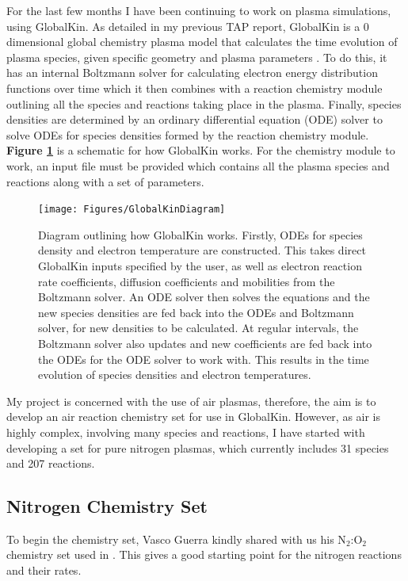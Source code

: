 \documentclass[11pt, oneside]{article}   	%
\begin{document}
For the last few months I have been continuing to work on plasma simulations, using GlobalKin.
As detailed in my previous TAP report, GlobalKin is a 0 dimensional global chemistry plasma model that calculates the time evolution of plasma species, given specific geometry and plasma parameters \cite{Stafford2004O2}.
To do this, it has an internal Boltzmann solver for calculating electron energy distribution functions over time which it then combines with a reaction chemistry module outlining all the species and reactions taking place in the plasma.
Finally, species densities are determined by an ordinary differential equation (ODE) solver to solve ODEs for species densities formed by the reaction chemistry module.
\textbf{Figure \ref{fig:GlobalKin}} is a schematic for how GlobalKin works.
For the chemistry module to work, an input file must be provided which contains all the plasma species and reactions along with a set of parameters.



\begin{figure}
\texttt{[image: Figures/GlobalKinDiagram]}
\caption{Diagram outlining how GlobalKin works. Firstly, ODEs for species density and electron temperature are constructed. This takes direct GlobalKin inputs specified by the user, as well as electron reaction rate coefficients, diffusion coefficients and mobilities from the Boltzmann solver. An ODE solver then solves the equations and the new species densities are fed back into the ODEs and Boltzmann solver, for new densities to be calculated. At regular intervals, the Boltzmann solver also updates and new coefficients are fed back into the ODEs for the ODE solver to work with. This results in the time evolution of species densities and electron temperatures.}
\label{fig:GlobalKin}
\end{figure}



My project is concerned with the use of air plasmas, therefore, the aim is to develop an air reaction chemistry set for use in GlobalKin.
However, as air is highly complex, involving many species and reactions, I have started with developing a set for pure nitrogen plasmas, which currently includes 31 species and 207 reactions.


\subsection{Nitrogen Chemistry Set}
To begin the chemistry set, Vasco Guerra kindly shared with us his N$_2$:O$_2$ chemistry set used in \cite{Kutasi2016tuning}.
This gives a good starting point for the nitrogen reactions and their rates.
\end{document}
